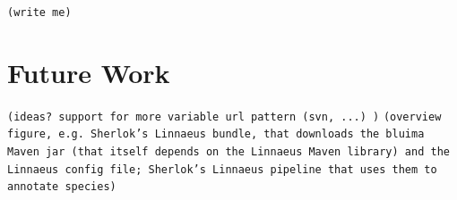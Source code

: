 \documentclass{article}
\newcommand{\TODO}[1]{\texttt{\textcolor{YellowOrange}{(#1)}}} %
\begin{document}
\TODO{write me}

\section{Future Work}

\TODO{ideas? support for more variable url pattern (svn, ...) }
\TODO{overview figure, e.g.  Sherlok's Linnaeus bundle, that downloads the bluima Maven jar (that itself depends on the Linnaeus Maven library) and the Linnaeus config file; Sherlok's Linnaeus pipeline that uses them to annotate species}
\end{document}
